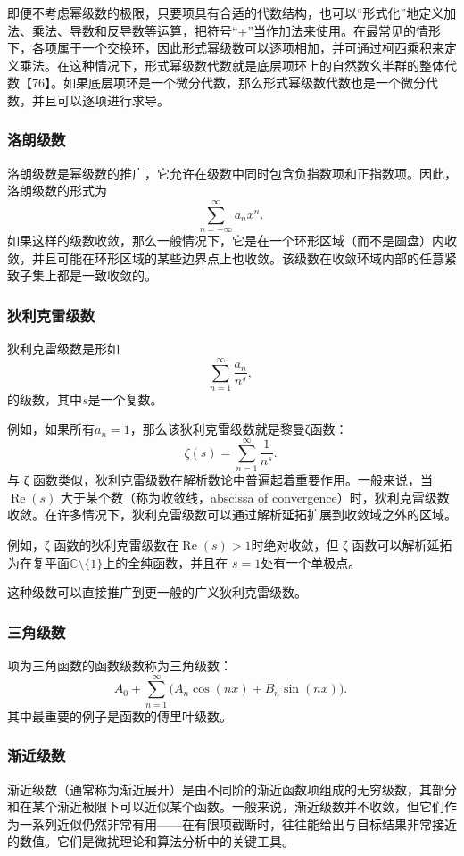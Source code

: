 即便不考虑幂级数的极限，只要项具有合适的代数结构，也可以“形式化”地定义加法、乘法、导数和反导数等运算，把符号“+”当作加法来使用。在最常见的情形下，各项属于一个交换环，因此形式幂级数可以逐项相加，并可通过柯西乘积来定义乘法。在这种情况下，形式幂级数代数就是底层项环上的自然数幺半群的整体代数【76】。如果底层项环是一个微分代数，那么形式幂级数代数也是一个微分代数，并且可以逐项进行求导。
\subsubsection{洛朗级数}
洛朗级数是幂级数的推广，它允许在级数中同时包含负指数项和正指数项。因此，洛朗级数的形式为
$$
\sum_{n=-\infty}^{\infty} a_{n}x^{n}.~
$$
如果这样的级数收敛，那么一般情况下，它是在一个环形区域（而不是圆盘）内收敛，并且可能在环形区域的某些边界点上也收敛。该级数在收敛环域内部的任意紧致子集上都是一致收敛的。
\subsubsection{狄利克雷级数}
狄利克雷级数是形如
$$
\sum_{n=1}^{\infty} \frac{a_{n}}{n^{s}},~
$$
的级数，其中$s$是一个复数。

例如，如果所有$a_{n} = 1$，那么该狄利克雷级数就是黎曼ζ函数：
$$
\zeta(s) = \sum_{n=1}^{\infty} \frac{1}{n^{s}}.~
$$
与 ζ 函数类似，狄利克雷级数在解析数论中普遍起着重要作用。一般来说，当 $\operatorname{Re}(s)$ 大于某个数（称为收敛线，abscissa of convergence）时，狄利克雷级数收敛。在许多情况下，狄利克雷级数可以通过解析延拓扩展到收敛域之外的区域。

例如，ζ 函数的狄利克雷级数在$\operatorname{Re}(s) > 1$时绝对收敛，但 ζ 函数可以解析延拓为在复平面$\mathbb{C} \setminus \{1\}$上的全纯函数，并且在 $s=1$处有一个单极点。

这种级数可以直接推广到更一般的广义狄利克雷级数。
\subsubsection{三角级数}
项为三角函数的函数级数称为三角级数：
$$
A_{0}+\sum_{n=1}^{\infty}\bigl(A_{n}\cos(nx)+B_{n}\sin(nx)\bigr).~
$$
其中最重要的例子是函数的傅里叶级数。
\subsubsection{渐近级数}
渐近级数（通常称为渐近展开）是由不同阶的渐近函数项组成的无穷级数，其部分和在某个渐近极限下可以近似某个函数。一般来说，渐近级数并不收敛，但它们作为一系列近似仍然非常有用——在有限项截断时，往往能给出与目标结果非常接近的数值。它们是微扰理论和算法分析中的关键工具。

